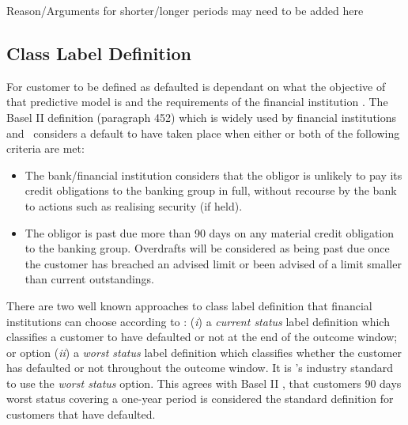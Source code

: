Reason/Arguments for shorter/longer periods may need to be added here \\

\subsection{Class Label Definition} \label{classLabelDef}
For customer to be defined as defaulted is dependant on what the objective of that predictive model is and the requirements of the financial institution \citep{mcnab_principles_2000}. The Basel II definition (paragraph 452) which is widely used by financial institutions and \subjectname\ considers a default to have taken place when either or both of the following criteria are met:
\vspace{-3mm} 
\begin{itemize}
	\item The bank/financial institution considers that the obligor is unlikely to pay its credit obligations to the banking group in full, without recourse by the bank to actions such as realising security (if held).
	\item The obligor is past due more than 90 days on any material credit obligation to the banking group. Overdrafts will be considered as being past due once the customer has breached an advised limit or been advised of a limit smaller than current outstandings.
\end{itemize} 

There are two well known approaches to class label definition that financial institutions can choose according to \cite{anderson_credit_2007}: (\textit{i}) a \textit{current status} label definition which classifies a customer to have defaulted or not at the end of the outcome window; or option (\textit{ii}) a \textit{worst status} label definition which classifies whether the customer has defaulted or not throughout the outcome window. It is \subjectname's industry standard to use the \textit{worst status} option. This agrees with Basel II \citep{basel_international_2006}, that customers 90 days worst status covering a one-year period is considered the standard definition for customers that have defaulted. 


